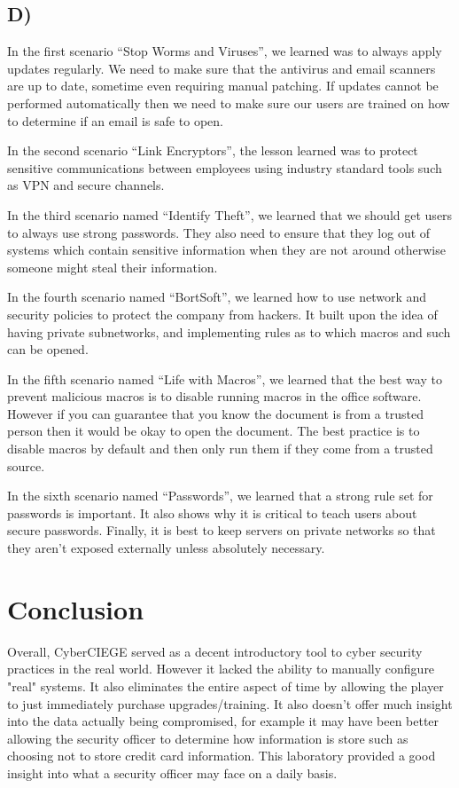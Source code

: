 \documentclass[fleqn, 12pt]{article}
\begin{document}
\subsection*{D)}

In the first scenario “Stop Worms and Viruses”, we learned was to always apply updates regularly. We need to make sure that the antivirus and email scanners are up to date, sometime even requiring manual patching. If updates cannot be performed automatically then we need to make sure our users are trained on how to determine if an email is safe to open.

In the second scenario “Link Encryptors”, the lesson learned was to protect sensitive communications between employees using industry standard tools such as VPN and secure channels.

In the third scenario named “Identify Theft”, we learned that we should get users to always use strong passwords. They also need to ensure that they log out of systems which contain sensitive information when they are not around otherwise someone might steal their information.

In the fourth scenario named “BortSoft”, we learned how to use network and security policies to protect the company from hackers. It built upon the idea of having private subnetworks, and implementing rules as to which macros and such can be opened.

In the fifth scenario named “Life with Macros”, we learned that the best way to prevent malicious macros is to disable running macros in the office software. However if you can guarantee that you know the document is from a trusted person then it would be okay to open the document. The best practice is to disable macros by default and then only run them if they come from a trusted source.

In the sixth scenario named “Passwords”, we learned that a strong rule set for passwords is important. It also shows why it is critical to teach users about secure passwords. Finally, it is best to keep servers on private networks so that they aren't exposed externally unless absolutely necessary.

\section*{Conclusion}

Overall, CyberCIEGE served as a decent introductory tool to cyber security practices in the real world. However it lacked the ability to manually configure "real" systems. It also eliminates the entire aspect of time by allowing the player to just immediately purchase upgrades/training. It also doesn't offer much insight into the data actually being compromised, for example it may have been better allowing the security officer to determine how information is store such as choosing not to store credit card information. This laboratory provided a good insight into what a security officer may face on a daily basis.
\end{document}

